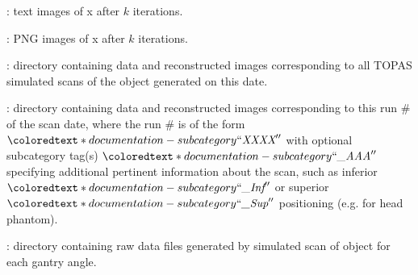 \begin{tcbfunctionenv}
\begin{tcbparagraph}
\begin{deepList}[labelindent=1pt, leftmargin=*]
\begin{deepList}[labelindent=1pt, leftmargin=*]
\begin{deepList}[labelindent=1pt, leftmargin=*]
\begin{deepList}[labelindent=1pt, leftmargin=*]
\begin{deepList}[labelindent=1pt, leftmargin=*]
\begin{deepList}[labelindent=1pt, leftmargin=*]
\begin{deepList}[labelindent=1pt, leftmargin=*]
\begin{deepList}[labelindent=1pt, leftmargin=*]
\begin{deepList}[labelindent=1pt, leftmargin=*]
\begin{deepList}[labelindent=1pt, leftmargin=*]
\begin{deepList}[labelindent=1pt, leftmargin=*]
                                                    \item {} : text images of x after $k$ iterations.
                                                    \item {} : PNG images of x after $k$ iterations.
                                                \end{deepList}
                                        \end{deepList}
                                    \end{deepList}
                                \end{deepList}
                            \end{deepList}
                        \end{deepList}
                    \end{deepList}
                \end{deepList}
                \item {} : directory containing data and reconstructed images corresponding to all TOPAS simulated scans of the object generated on this date.
                \begin{deepList}[labelindent=1pt, leftmargin=*]
                    \item {} : directory containing data and reconstructed images corresponding to this run \# of the scan date, where the run \# is of the form $\coloredtext*{documentation-subcategory}{``\textit{XXXX}''}$ with optional subcategory tag(s) $\coloredtext*{documentation-subcategory}{``\textit{\_AAA}''}$ specifying additional pertinent information about the scan, such as inferior $\coloredtext*{documentation-subcategory}{``\textit{\_Inf}''}$ or superior $\coloredtext*{documentation-subcategory}{``\textit{\_Sup}''}$ positioning (e.g. for head phantom).
                    \begin{deepList}[labelindent=1pt, leftmargin=*]
                        \item {} : directory containing raw data files generated by simulated scan of object for each gantry angle.

\end{deepList}
\end{deepList}
\end{deepList}
\end{deepList}
\end{deepList}
\end{tcbparagraph}
\end{tcbfunctionenv}

